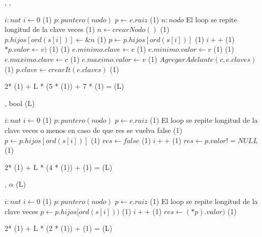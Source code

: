 {   ,
    ,
    }
{}{}
{
	\var $i : nat$
	\State $ i \gets 0$  												\comment \bigo(1) 
	\var $p : puntero(nodo)$ 
	\State $ p \gets e.raiz$											\comment \bigo(1) 
	\var $n : nodo$ 
   		\Statex             \comment El loop se repite longitud de la clave veces
     	                     			\comment \bigo(1)
        \State $n \gets crearNodo()$      							\comment \bigo(1)
        \State $p.hijos[ord(s[i])] \gets \&n$              			\comment \bigo(1)
     	\EndIf
     	\State $p \gets p.hijos[ord(s[i])]$								\comment \bigo(1)
     	\State $i++$   													\comment \bigo(1) 
  \EndWhile		
	\State $*p.valor \gets v)$										\comment \bigo(1)
                       					\comment \bigo(1)
    \State $e.minimo.clave \gets c$     				 	\comment \bigo(1)
    \State $e.minimo.valor \gets v$     				 \comment \bigo(1)
  \EndIf	
                       					\comment \bigo(1)
    \State $e.maximo.clave \gets c$     				 	\comment \bigo(1)
    \State $e.maximo.valor \gets v$     				 	\comment \bigo(1)
  \EndIf
  \State $AgregarAdelante(c, e.claves)$					 \comment \bigo(1)
  \State $p.clave \gets crearIt(e.claves)$        \comment \bigo(1)

}	{  2* \bigo(1) + L * (5 * \bigo(1)) + 7 * \bigo(1) = \bigo(L) }

{   ,
    }
    {bool}
    {\bigo(L)}
{
	\var $i : nat$
	\State $ i \gets 0$  												\comment \bigo(1) 
	\var $p : puntero(nodo)$ 
	\State $ p \gets e.raiz$											\comment \bigo(1)    
	\Statex             \comment El loop se repite longitud de la clave veces o menos en caso de que res se vuelva false
		                      			\comment \bigo(1)
		 	\State $p \gets p.hijos[ord(s[i])]$							\comment \bigo(1)
		 \Else
            \State $res \gets false$  									\comment \bigo(1)
     	 \EndIf	
     	\State $i++$   													\comment \bigo(1) 
    \EndWhile		
	\State $res \gets p.valor != NULL$									\comment \bigo(1)	
	\EndIf												 

}	{  2* \bigo(1) + L * (4 * \bigo(1)) + \bigo(1) = \bigo(L) }


{   ,
    }
    {$\alpha$}
    {\bigo(L)}
{
	\var $i : nat$
	\State $ i \gets 0$  												\comment \bigo(1) 
	\var $p : puntero(nodo)$ 
	\State $ p \gets e.raiz$											\comment \bigo(1)  
     	\Statex             \comment El loop se repite longitud de la clave veces
     	\State $p \gets p.hijos[ord(s[i]))$								\comment \bigo(1)
     	\State $i++$   													\comment \bigo(1) 
    \EndWhile		
	\State $res \gets (*p).valor)$										\comment \bigo(1)												 

}	{  2* \bigo(1) + L * (2 * \bigo(1)) + \bigo(1) = \bigo(L) }

